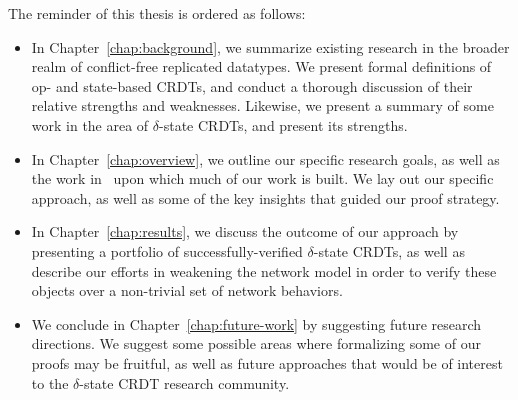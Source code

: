The reminder of this thesis is ordered as follows:
\begin{itemize}
  \item In Chapter~\ref{chap:background}, we summarize existing research in the
    broader realm of conflict-free replicated datatypes. We present formal
    definitions of op- and state-based CRDTs, and conduct a thorough discussion
    of their relative strengths and weaknesses. Likewise, we present a summary
    of some work in the area of $\delta$-state CRDTs, and present its strengths.
  \item In Chapter~\ref{chap:overview}, we outline our specific research goals,
    as well as the work in~\citep{almedia18} upon which much of our work is
    built. We lay out our specific approach, as well as some of the key insights
    that guided our proof strategy.
  \item In Chapter~\ref{chap:results}, we discuss the outcome of our approach by
    presenting a portfolio of successfully-verified $\delta$-state CRDTs, as
    well as describe our efforts in weakening the network model in order to
    verify these objects over a non-trivial set of network behaviors.
  \item We conclude in Chapter~\ref{chap:future-work} by suggesting future
    research directions. We suggest some possible areas where formalizing some
    of our proofs may be fruitful, as well as future approaches that would be of
    interest to the $\delta$-state CRDT research community.
\end{itemize}
